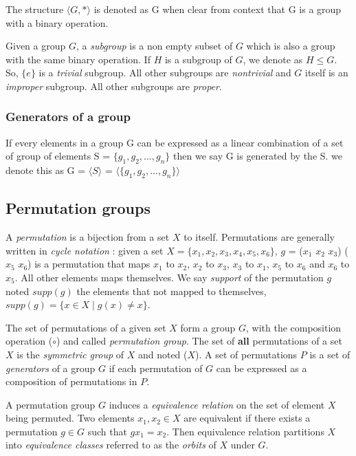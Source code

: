 The structure $\langle G, * \rangle$ is denoted as G when clear from context that G is a group
with a binary operation.

Given a group $G$, a \emph{subgroup} is a non empty subset of $G$ which is also a group with 
the same binary operation. If $H$ is a subgroup of $G$, we denote as $H \leq G$.
So, $\{e\}$ is a \emph{trivial} subgroup. All other subgroups are \emph{nontrivial} and
$G$ itself is an \emph{improper} subgroup. All other subgroups are \emph{proper}.




\subsubsection{Generators of a group}

If every elements in a group G can be expressed as a linear combination
of a set of group of elements S = $\{g_1, g_2, ..., g_n \}$ then we say G is 
generated by the S. we denote this as G = $\langle S \rangle$ =
$\langle \{g_1, g_2, ..., g_n \} \rangle$ 


\subsection{Permutation groups}


A \emph{permutation} is a bijection from a set $X$ to itself. Permutations are generally written in 
\emph{cycle notation} : given a set $X = \{x_1, x_2, x_3, x_4, x_5, x_6\}$, $g$ = ($x_1$ $x_2$ $x_3$) ($x_5$ $x_6$) 
is a permutation that maps $x_1$ to $x_2$, $x_2$ to $x_3$, $x_3$ to $x_1$,  $x_5$ to $x_6$ and $x_6$ to $x_5$.
All other elements maps themselves.
We say \emph{support} of the permutation $g$ noted $supp(g)$ the elements that not mapped to themselves,
$supp(g) = \{ x \in X \mid g(x) \neq x\}$.


 The set of permutations of a given set $X$ form a group $G$,
with the composition operation ($\circ$) and called \emph{permutation group}.
The set of \textbf{all} permutations of a set $X$ is the \emph{symmetric group} of $X$ and noted \Group($X$).
A set of permutations $P$ is a set of \emph{generators} of a group $G$ if each permutation of $G$
can be expressed as a composition of permutations in $P$. 


A permutation group $G$ induces a \emph{equivalence relation} on the set of element $X$ being
permuted. Two elements $x_1, x_2 \in X$ are equivalent if there exists a permutation $g \in G$ such that
$g x_1 = x_2$. Then equivalence relation partitions $X$ into \emph{equivalence classes} referred to
as the \emph{orbits} of $X$ under $G$. 




